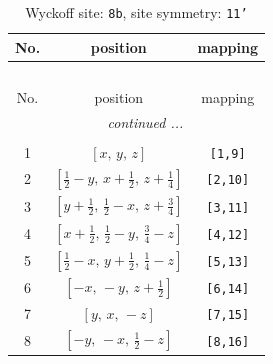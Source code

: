 \documentclass[fleqn,8pt]{jsarticle}
\begin{document}
\begin{longtable}{ccc}
\caption{Wyckoff site: {\tt 8b}, site symmetry: {\tt 11'}}
 \\
 \hline \hline
No. & position & mapping \\ \hline \endfirsthead

\multicolumn{2}{l}{\tablename\ \thetable{}} \\
 \hline \hline
No. & position & mapping \\ \hline \endhead

 \hline \hline
\multicolumn{2}{r}{\footnotesize\it continued ...} \\ \endfoot

 \hline \hline
\multicolumn{2}{r}{} \\ \endlastfoot

1 & $\left[ x,\, y,\, z \right]$ & {\tt [1,9]} \\ \hline
2 & $\left[ \frac{1}{2} - y,\, x + \frac{1}{2},\, z + \frac{1}{4} \right]$ & {\tt [2,10]} \\ \hline
3 & $\left[ y + \frac{1}{2},\, \frac{1}{2} - x,\, z + \frac{3}{4} \right]$ & {\tt [3,11]} \\ \hline
4 & $\left[ x + \frac{1}{2},\, \frac{1}{2} - y,\, \frac{3}{4} - z \right]$ & {\tt [4,12]} \\ \hline
5 & $\left[ \frac{1}{2} - x,\, y + \frac{1}{2},\, \frac{1}{4} - z \right]$ & {\tt [5,13]} \\ \hline
6 & $\left[ - x,\, - y,\, z + \frac{1}{2} \right]$ & {\tt [6,14]} \\ \hline
7 & $\left[ y,\, x,\, - z \right]$ & {\tt [7,15]} \\ \hline
8 & $\left[ - y,\, - x,\, \frac{1}{2} - z \right]$ & {\tt [8,16]} \\
\end{longtable}
\end{document}
